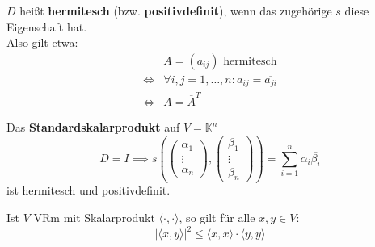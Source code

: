 \documentclass[parskip,a4paper,twoside,DIV15,BCOR12mm]{scrbook}
\begin{document}
\begin{comment}
\index{Darstellungsmatrix}
Ist $\dim V=n<\infty$ mit einer Basis $B=\{b_1,\ldots,b_n\}$, so ist eine
Sesquilinearform $s$ bestimmt durch die Werte $s(b_i,b_j)\in\mathbb{K}$, also
durch die \textbf{Darstellungsmatrix}
\[D_{BB}(s):=(s(b_i,bj))\in\mathbb{K}^{n\times n}\]
Jede beliebige Matrix $D=(d_{ij})\in\mathbb{K}^{n\times n}$ definiert ein
$s:=s_B^D$ mit:
\[s(\sum_{i=1}^n \alpha_i b_i,\sum_{j=1}^n \beta_j b_j)=\sum_{i=1}^n\sum_{j=1}^n \alpha_i\overline{\beta_j}\cdot d_{ij}\]
\end{comment}

\begin{definition}
$D$ heißt \textbf{hermitesch} (bzw. \textbf{positivdefinit}), wenn das zugehörige $s$
diese Eigenschaft hat.\\
Also gilt etwa:
\begin{align*}
&A=(a_{ij}) \text{ hermitesch}\\
\iff &\forall i,j=1,\ldots,n:a_{ij}=\overline{a_{ji}}\\
\iff &A=\overline{A}^T
\end{align*}
\end{definition}

\begin{example}
Das \textbf{Standardskalarprodukt} auf $V=\mathbb{K}^n$
\[D=I \implies s(\begin{pmatrix}\alpha_1\\\vdots\\\alpha_n \end{pmatrix},
\begin{pmatrix}\beta_1\\\vdots\\\beta_n \end{pmatrix})=\sum_{i=1}^n \alpha_i\overline{\beta_i}\]
ist hermitesch und positivdefinit.
\end{example}

\begin{theo}
\label{Satz 16.1}
Ist $V$ VRm mit Skalarprodukt $\langle\cdot,\cdot\rangle$, so gilt für alle $x,y\in V$:
\[|\langle x,y\rangle|^2 \le \langle x,x\rangle \cdot \langle y,y\rangle\]
\end{theo}
\end{document}
